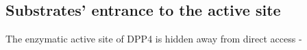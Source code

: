 \subsection{Substrates' entrance to the active site}

The enzymatic active site of DPP4 is hidden away from direct access \beta-